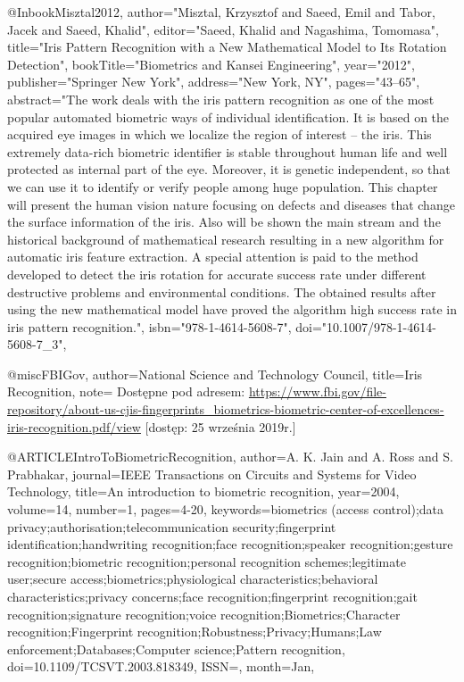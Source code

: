 \documentclass[10pt,polish,a4paper,oneside]{ppfcmthesis}
\begin{document}
{@Inbook{Misztal2012,
author="Misztal, Krzysztof
and Saeed, Emil
and Tabor, Jacek
and Saeed, Khalid",
editor="Saeed, Khalid
and Nagashima, Tomomasa",
title="Iris Pattern Recognition with a New Mathematical Model to Its Rotation Detection",
bookTitle="Biometrics and Kansei Engineering",
year="2012",
publisher="Springer New York",
address="New York, NY",
pages="43--65",
abstract="The work deals with the iris pattern recognition as one of the most popular automated biometric ways of individual identification. It is based on the acquired eye images in which we localize the region of interest -- the iris. This extremely data-rich biometric identifier is stable throughout human life and well protected as internal part of the eye. Moreover, it is genetic independent, so that we can use it to identify or verify people among huge population. This chapter will present the human vision nature focusing on defects and diseases that change the surface information of the iris. Also will be shown the main stream and the historical background of mathematical research resulting in a new algorithm for automatic iris feature extraction. A special attention is paid to the method developed to detect the iris rotation for accurate success rate under different destructive problems and environmental conditions. The obtained results after using the new mathematical model have proved the algorithm high success rate in iris pattern recognition.",
isbn="978-1-4614-5608-7",
doi="10.1007/978-1-4614-5608-7_3",
}

@misc{FBIGov,
  author={National Science and Technology Council},
  title={Iris Recognition},
  note={ Dostępne pod adresem: \url{https://www.fbi.gov/file-repository/about-us-cjis-fingerprints_biometrics-biometric-center-of-excellences-iris-recognition.pdf/view}  [dostęp: 25 września 2019r.]}
}

@ARTICLE{IntroToBiometricRecognition,
author={A. K. {Jain} and A. {Ross} and S. {Prabhakar}},
journal={IEEE Transactions on Circuits and Systems for Video Technology},
title={An introduction to biometric recognition},
year={2004},
volume={14},
number={1},
pages={4-20},
keywords={biometrics (access control);data privacy;authorisation;telecommunication security;fingerprint identification;handwriting recognition;face recognition;speaker recognition;gesture recognition;biometric recognition;personal recognition schemes;legitimate user;secure access;biometrics;physiological characteristics;behavioral characteristics;privacy concerns;face recognition;fingerprint recognition;gait recognition;signature recognition;voice recognition;Biometrics;Character recognition;Fingerprint recognition;Robustness;Privacy;Humans;Law enforcement;Databases;Computer science;Pattern recognition},
doi={10.1109/TCSVT.2003.818349},
ISSN={},
month={Jan},}

}
\end{document}

